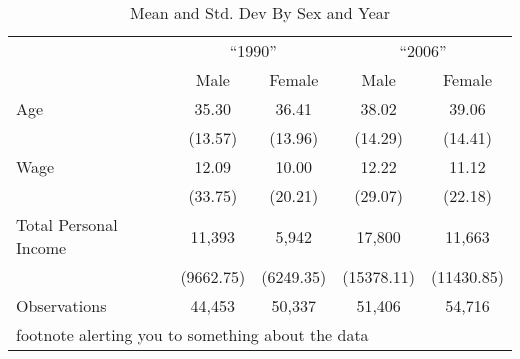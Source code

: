 \begin{table}[htbp]\centering
\def\sym#1{\ifmmode^{#1}\else\(^{#1}\)\fi}
\caption{Mean and Std. Dev By Sex and Year\label{sexyear}}
\begin{tabular}{l*{4}{c}}
\toprule
                    &\multicolumn{2}{c}{“1990”}&\multicolumn{2}{c}{“2006”}\\\cmidrule(lr){2-3}\cmidrule(lr){4-5}
                    &\multicolumn{1}{c}{Male}&\multicolumn{1}{c}{Female}&\multicolumn{1}{c}{Male}&\multicolumn{1}{c}{Female}\\
\midrule
Age                 &       35.30&       36.41&       38.02&       39.06\\
                    &     (13.57)&     (13.96)&     (14.29)&     (14.41)\\
\addlinespace
Wage                &       12.09&       10.00&       12.22&       11.12\\
                    &     (33.75)&     (20.21)&     (29.07)&     (22.18)\\
\addlinespace
Total Personal Income&      11,393&       5,942&      17,800&      11,663\\
                    &   (9662.75)&   (6249.35)&  (15378.11)&  (11430.85)\\
\midrule
Observations        &      44,453&      50,337&      51,406&      54,716\\
\bottomrule
\multicolumn{5}{l}{\footnotesize footnote alerting you to something about the data}\\
\end{tabular}
\end{table}
